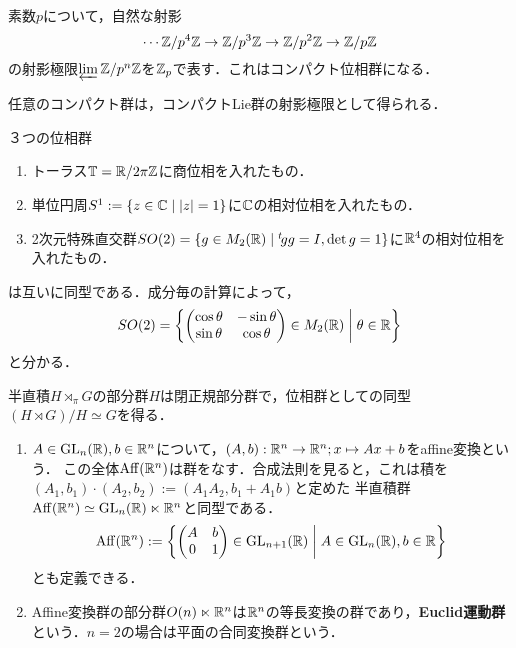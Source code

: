 \documentclass[uplatex,dvipdfmx]{jsreport}
\begin{document}
\begin{example}
    素数$p$について，自然な射影
    \[\cdots\mathbb{Z}/p^4\mathbb{Z}\to\mathbb{Z}/p^3\mathbb{Z}\to\mathbb{Z}/p^2\mathbb{Z}\to\mathbb{Z}/p\mathbb{Z}\]
    の射影極限$\varprojlim\mathbb{Z}/p^n\mathbb{Z}$を$\mathbb{Z}_p$で表す．これはコンパクト位相群になる．
\end{example}

\begin{theorem}
    任意のコンパクト群は，コンパクトLie群の射影極限として得られる．
\end{theorem}

\begin{example}[円周と同型な位相群]
    ３つの位相群
    \begin{enumerate}
        \item トーラス$\mathbb{T}=\mathbb{R}/2\pi\mathbb{Z}$に商位相を入れたもの．
        \item 単位円周$S^1:=\left\{z\in\mathbb{C}\mid\lvert z\rvert=1\right\}$に$\mathbb{C}$の相対位相を入れたもの．
        \item 2次元特殊直交群$SO(2)=\left\{g\in M_2(\mathbb{R})\mid {}^t\!gg=I,\det g=1\right\}$に$\mathbb{R}^4$の相対位相を入れたもの．
    \end{enumerate}
    は互いに同型である．成分毎の計算によって，
    \[SO(2)=\left\{\begin{pmatrix}\cos\theta&-\sin\theta\\\sin\theta&\cos\theta\end{pmatrix}\in M_2(\mathbb{R})\;\middle|\;\theta\in\mathbb{R}\right\}\]
    と分かる．
\end{example}

\begin{example}[半直積]
    半直積$H\rtimes_\pi G$の部分群$H$は閉正規部分群で，位相群としての同型$(H\rtimes G)/H\simeq G$を得る．
\end{example}

\begin{example}[Affine変換群とEuclid運動群]\mbox{}\label{exp-Affine-transformation-and-Euclid-motion-group}
    \begin{enumerate}
        \item 
    $A\in\mathrm{GL}_n(\mathbb{R}),b\in\mathbb{R}^n$について，$(A,b):\mathbb{R}^n\to\mathbb{R}^n;x\mapsto Ax+b$をaffine変換という．
    この全体$\mathrm{Aff}(\mathbb{R}^n)$は群をなす．合成法則を見ると，これは積を$(A_1,b_1)\cdot(A_2,b_2):=(A_1A_2,b_1+A_1b)$と定めた
    半直積群$\mathrm{Aff}(\mathbb{R}^n)\simeq\mathrm{GL}_n(\mathbb{R})\ltimes\mathbb{R}^n$と同型である．
    \[\mathrm{Aff}(\mathbb{R}^n):=\left\{\begin{pmatrix}A&b\\0&1\end{pmatrix}\in\mathrm{GL}_{n+1}(\mathbb{R})\;\middle|\;A\in\mathrm{GL}_n(\mathbb{R}),b\in\mathbb{R}\right\}\]
    とも定義できる．
    \item Affine変換群の部分群$O(n)\ltimes\mathbb{R}^n$は$\mathbb{R}^n$の等長変換の群であり，\textbf{Euclid運動群}という．$n=2$の場合は平面の合同変換群という．
    \end{enumerate}
\end{example}
\end{document}
